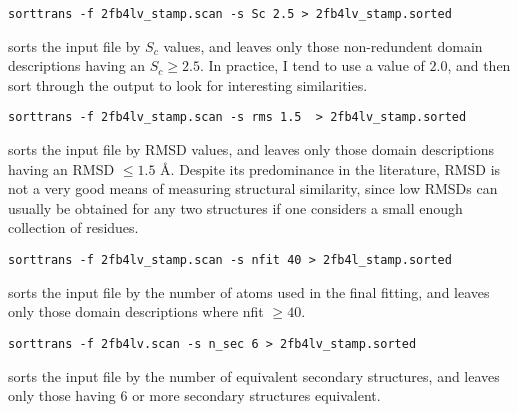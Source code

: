 \begin{scriptsize}\begin{verbatim}
sorttrans -f 2fb4lv_stamp.scan -s Sc 2.5 > 2fb4lv_stamp.sorted
\end{verbatim} \end{scriptsize}

sorts the input file by $S_{c}$ values, and leaves only those non-redundent 
domain descriptions having an $S_{c} \geq 2.5$.  In practice, I tend to
use a value of $2.0$, and then sort through the output to look for
interesting similarities.  \\

\begin{scriptsize}\begin{verbatim}
sorttrans -f 2fb4lv_stamp.scan -s rms 1.5  > 2fb4lv_stamp.sorted
\end{verbatim} \end{scriptsize}

sorts the input file by RMSD values, and leaves only those domain
descriptions having an RMSD $\leq 1.5$ \AA.  Despite its predominance in
the literature, RMSD is not a very good means of measuring structural 
similarity, since low RMSDs can usually be obtained for any two structures
if one considers a small enough collection of residues.\\


\begin{scriptsize}\begin{verbatim}
sorttrans -f 2fb4lv_stamp.scan -s nfit 40 > 2fb4l_stamp.sorted
\end{verbatim} \end{scriptsize}
 
sorts the input file by the number of atoms used in the final
fitting, and leaves only those domain descriptions where nfit $\geq 40$.\\

\begin{scriptsize}\begin{verbatim}
sorttrans -f 2fb4lv.scan -s n_sec 6 > 2fb4lv_stamp.sorted 
\end{verbatim} \end{scriptsize}

sorts the input file by the number of equivalent secondary 
structures, and leaves only those having $6$ or more secondary
structures equivalent.\\

